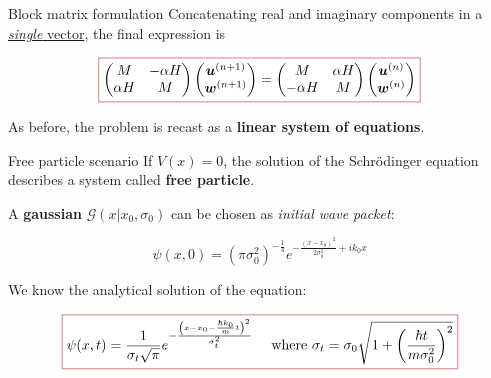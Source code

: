 \begin{frame}{Block matrix formulation}
    Concatenating real and imaginary components in a \underline{\textit{single} vector}, the final expression is

    \begin{equation*}
        \fcolorbox{BrickRed}{white}{\text{$\displaystyle\begin{pmatrix}
            M & -\alpha H\\
            \alpha H & M
        \end{pmatrix}
        \begin{pmatrix}
            \boldsymbol{u}^{(n+1)}\\
            \boldsymbol{w}^{(n+1)}
        \end{pmatrix}
        =
        \begin{pmatrix}
            M & \alpha H\\
            -\alpha H & M
        \end{pmatrix}
        \begin{pmatrix}
            \boldsymbol{u}^{(n)}\\
            \boldsymbol{w}^{(n)}
        \end{pmatrix}$}}
    \end{equation*}

    \vfill

    \normalsize

    \begin{center}
        As before, the problem is recast as a \textbf{linear system of equations}.
   \end{center}

    \vfill
\end{frame}

\begin{frame}{Free particle scenario}
    If $V(x)=0$, the solution of the Schrödinger equation describes a system called \textcolor{BrickRed}{\textbf{free particle}}.

    \pause

    \vfill

    A \textbf{gaussian} $\mathcal{G}\left(x|x_0,\sigma_0\right)$ can be chosen as \textit{initial wave packet}:

    \begin{equation*}
        \psi(x,0)=\left(\pi\sigma_0^2\right)^{-\frac{1}{4}}e^{-\frac{\left(x-x_0\right)^2}{2\sigma_0^2}+ik_0x}
    \end{equation*}

    We know the analytical solution of the equation:

    \begin{equation*}
        \fcolorbox{BrickRed}{white}{\text{$\displaystyle\psi(x,t)=\frac{1}{\sigma_t\sqrt{\pi}}e^{-\frac{\left(x-x_0-\frac{\hbar k_0}{m}t\right)^2}{\sigma_t^2}} \ \ \ \ \text{where} \ \sigma_t=\sigma_0\sqrt{1+\left(\frac{\hbar t}{m\sigma_0^2}\right)^2}$}}
    \end{equation*}
\end{frame}

